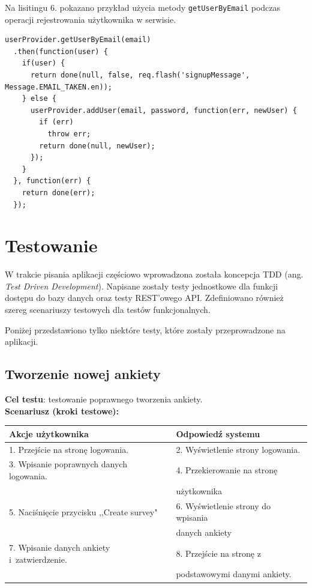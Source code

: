 \documentclass[12pt,a4paper,notitlepage]{article}
\begin{document}
\par Na lisitingu 6. pokazano przykład użycia metody \texttt{getUserByEmail} podczas operacji rejestrowania użytkownika w serwisie.

\newpage
\begin{lstlisting}[caption=Przykład użycia metody \texttt{getUserByEmail} ]
userProvider.getUserByEmail(email)
  .then(function(user) {
    if(user) {
      return done(null, false, req.flash('signupMessage', Message.EMAIL_TAKEN.en));
    } else {
      userProvider.addUser(email, password, function(err, newUser) {
        if (err)
          throw err;
        return done(null, newUser);
      });
    }
  }, function(err) {
    return done(err);
  });
\end{lstlisting}

\newpage
\section{Testowanie}
W trakcie pisania aplikacji częściowo wprowadzona została koncepcja TDD (ang. \textit{Test Driven Development}). Napisane zostały testy jednostkowe dla funkcji dostępu do bazy danych oraz testy REST'owego API. Zdefiniowano również szereg scenariuszy testowych dla testów funkcjonalnych.
\par Poniżej przedstawiono tylko niektóre testy, które zostały przeprowadzone na aplikacji.

\subsection{Tworzenie nowej ankiety}
\textbf{Cel testu}: testowanie poprawnego tworzenia ankiety. \\
\textbf{Scenariusz (kroki testowe):}
\begin{center}

  \begin{tabular}{| l| l|}
    \hline
    
 \textbf{Akcje użytkownika} &  \textbf{Odpowiedź systemu} \\  \hline
1. Przejście na stronę logowania. & 2. Wyświetlenie strony logowania. \\ 
3. Wpisanie poprawnych danych logowania. & 4. Przekierowanie na stronę  \\ 
& użytkownika \\ 
5. Naciśnięcie przycisku ,,Create survey" & 6. Wyświetlenie strony do wpisania \\ & danych ankiety \\
7. Wpisanie danych ankiety i~zatwierdzenie. & 8. Przejście na stronę z~ \\ &  podstawowymi danymi ankiety. \\
\hline
 
  \end{tabular}
\end{center}
\end{document}
